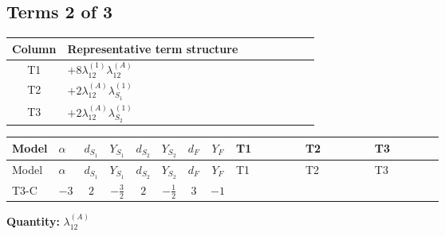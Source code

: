 \documentclass[8pt]{article}
\begin{document}
\begin{landscape}
\subsection*{Terms 2 of 3}
\begin{center}
\begin{tabular}{@{}c >{\raggedright\arraybackslash}p{0.82\linewidth}@{}}
\toprule
Column & Representative term structure \\
\midrule
T1 & \(\displaystyle +8 {\lambda_{12}^{(1)}} {\lambda_{12}^{(A)}}\) \\
\midrule
T2 & \(\displaystyle +2 {\lambda_{12}^{(A)}} {\lambda_{S_1}^{(1)}}\) \\
\midrule
T3 & \(\displaystyle +2 {\lambda_{12}^{(A)}} {\lambda_{S_2}^{(1)}}\) \\
\midrule
\bottomrule
\end{tabular}
\end{center}
\smallskip
\tiny
\begin{longtable}{@{}llcccccc >{\raggedright\arraybackslash}p{0.21\linewidth} >{\raggedright\arraybackslash}p{0.21\linewidth} >{\raggedright\arraybackslash}p{0.21\linewidth}@{}}
\toprule
Model & $\alpha$ & $d_{S_1}$ & $Y_{S_1}$ & $d_{S_2}$ & $Y_{S_2}$ & $d_F$ & $Y_F$ & T1 & T2 & T3 \\
\midrule
\endfirsthead
\toprule
Model & $\alpha$ & $d_{S_1}$ & $Y_{S_1}$ & $d_{S_2}$ & $Y_{S_2}$ & $d_F$ & $Y_F$ & T1 & T2 & T3 \\
\midrule
\endhead
T3-C & $-3$ & $2$ & $-\frac{3}{2}$ & $2$ & $-\frac{1}{2}$ & $3$ & $-1$ & \scriptsize\adjustbox{max width=\linewidth}{$\begin{gathered} +8 {\lambda_{12}^{(1)}} {\lambda_{12}^{(A)}}\end{gathered}$} & \scriptsize\adjustbox{max width=\linewidth}{$\begin{gathered} +2 {\lambda_{12}^{(A)}} {\lambda_{S_1}^{(1)}}\end{gathered}$} & \scriptsize\adjustbox{max width=\linewidth}{$\begin{gathered} +2 {\lambda_{12}^{(A)}} {\lambda_{S_2}^{(1)}}\end{gathered}$} \\
\midrule
\bottomrule
\end{longtable}
\clearpage
\noindent\textbf{Quantity: }$\lambda_{12}^{(A)}$\par\smallskip

\end{landscape}
\end{document}
